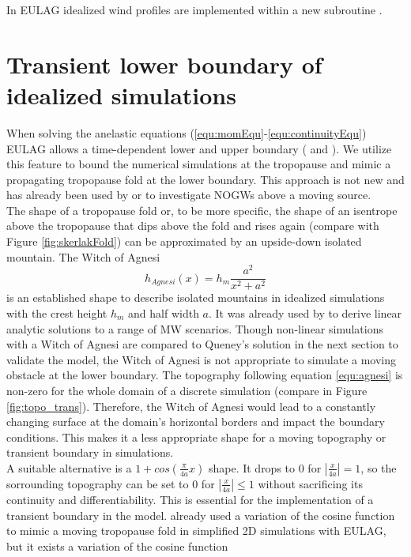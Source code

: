In EULAG idealized wind profiles are implemented within a new subroutine . 

\section{Transient lower boundary of idealized simulations}
\label{sec:trans-boundary}
When solving the anelastic equations (\ref{equ:momEqu}-\ref{equ:continuityEqu}) EULAG allows a time-dependent lower and upper boundary (\cite[]{prusa_propagation_1996} and \cite[]{wedi_extending_2003}). We utilize this feature to bound the numerical simulations at the tropopause and mimic a propagating tropopause fold at the lower boundary. This approach is not new and has already been used by \textcite[]{pfister_gravity_1993} or \textcite[]{prusa_all-scale_2003} to investigate NOGWs above a moving source. \\
The shape of a tropopause fold or, to be more specific, the shape of an isentrope above the tropopause that dips above the fold and rises again (compare with Figure \ref{fig:skerlakFold}) can be approximated by an upside-down isolated mountain.
The Witch of Agnesi
\begin{equation}
    h_{Agnesi}(x) = h_m \frac{a^2}{x^2+a^2}
    \label{equ:agnesi}
\end{equation}
is an established shape to describe isolated mountains in idealized simulations with the crest height $h_m$ and half width $a$. It was already used by \textcite{queney_problem_1948} to derive linear analytic solutions to a range of MW scenarios. Though non-linear simulations with a Witch of Agnesi are compared to Queney's solution in the next section to validate the model, the Witch of Agnesi is not appropriate to simulate a moving obstacle at the lower boundary. The topography following equation \ref{equ:agnesi} is non-zero for the whole domain of a discrete simulation (compare in Figure \ref{fig:topo_trans}). Therefore, the Witch of Agnesi would lead to a constantly changing surface at the domain's horizontal borders and impact the boundary conditions. This makes it a less appropriate shape for a moving topography or transient boundary in simulations. \\
A suitable alternative is a $1+cos(\frac{\pi}{4a}x)$ shape. It drops to 0 for $|\frac{x}{4a}| = 1$, so the sorrounding topography can be set to 0 for $|\frac{x}{4a}| \leq 1$ without sacrificing its continuity and differentiability. This is essential for the implementation of a transient boundary in the model. \textcite[]{prusa_all-scale_2003} already used a variation of the cosine function to mimic a moving tropopause fold in simplified 2D simulations with EULAG, but it exists a variation of the cosine function 
